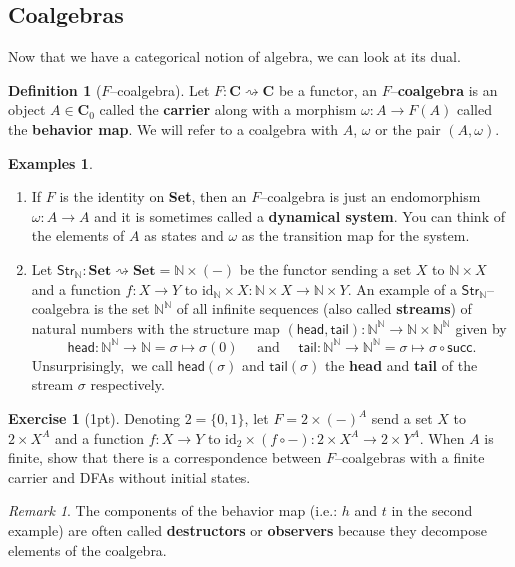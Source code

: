 \documentclass{article}
\theoremstyle{definition}
\newtheorem{defn}[thm]{Definition}
\newtheorem{exmps}[thm]{Examples}
\newtheorem{exer}{Exercise}
\theoremstyle{remark}
\newtheorem{rem}[thm]{Remark}
\newcommand{\N}{\mathbb{N}}
\newcommand{\id}{\text{id}}
\renewcommand{\succ}{\textsf{succ}}
\newcommand{\Str}{\textsf{Str}}
\newcommand{\head}{\textsf{head}}
\newcommand{\tail}{\textsf{tail}}
\begin{document}
\subsection{Coalgebras}
Now that we have a categorical notion of algebra, we can look at its dual.
\begin{defn}[$F$--coalgebra]
	Let $F:\mathbf{C}\rightsquigarrow \mathbf{C}$ be a functor, an $F$--\textbf{coalgebra} is an object $A \in \mathbf{C}_0$ called the \textbf{carrier} along with a morphism $\omega: A\rightarrow F(A)$ called the \textbf{behavior map}. We will refer to a coalgebra with $A$, $\omega$ or the pair $(A, \omega)$.
\end{defn}
\begin{exmps}\label{exmpcoalg}
	\begin{enumerate}
		\item If $F$ is the identity on \textbf{Set}, then an $F$--coalgebra is just an endomorphism $\omega:A\rightarrow A$ and it is sometimes called a \textbf{dynamical system}. You can think of the elements of $A$ as states and $\omega$ as the transition map for the system.
        \item Let $\Str_{\N}:\textbf{Set}\rightsquigarrow\textbf{Set} = \N \times (-)$ be the functor sending a set $X$ to $\N\times X$ and a function $f: X\rightarrow Y$ to $\id_\N \times X : \N\times X \rightarrow \N\times Y$. An example of a $\Str_{\N}$--coalgebra is the set $\N^{\N}$ of all infinite sequences (also called \textbf{streams}) of natural numbers with the structure map $(\head,\tail): \N^\N \rightarrow \N \times \N^\N$ given by \[\head:\N^{\N} \rightarrow \N = \sigma \mapsto \sigma(0)\quad \text{ and } \quad \tail:\N^{\N} \rightarrow \N^{\N} = \sigma \mapsto \sigma \circ \succ.\]
        Unsurprisingly, we call $\head(\sigma)$ and $\tail(\sigma)$ the \textbf{head} and \textbf{tail} of the stream $\sigma$ respectively.
	\end{enumerate}
\end{exmps}
\begin{exer}[1pt]
    Denoting $2 = \{0,1\}$, let $F = 2\times (-)^A$ send a set $X$ to $2 \times X^A$ and a function $f: X \rightarrow Y$ to $\id_2 \times (f \circ -): 2\times X^A \rightarrow 2 \times Y^A$. When $A$ is finite, show that there is a correspondence between $F$--coalgebras with a finite carrier and DFAs without initial states.
\end{exer}
\begin{rem}
	The components of the behavior map (i.e.: $h$ and $t$ in the second example) are often called \textbf{destructors} or \textbf{observers} because they decompose elements of the coalgebra.
\end{rem}
\end{document}

